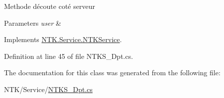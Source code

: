 Methode d\textquotesingle{}écoute coté serveur 


\begin{DoxyParams}{Parameters}
{\em user} & \\
\hline
\end{DoxyParams}


Implements \mbox{\hyperlink{class_n_t_k_1_1_service_1_1_n_t_k_service_a7c7cb8c5ddc57bebe6d9784744c976d7}{N\+T\+K.\+Service.\+N\+T\+K\+Service}}.



Definition at line 45 of file N\+T\+K\+S\+\_\+\+Dpt.\+cs.



The documentation for this class was generated from the following file\+:\begin{DoxyCompactItemize}
\item 
N\+T\+K/\+Service/\mbox{\hyperlink{_n_t_k_s___dpt_8cs}{N\+T\+K\+S\+\_\+\+Dpt.\+cs}}\end{DoxyCompactItemize}
